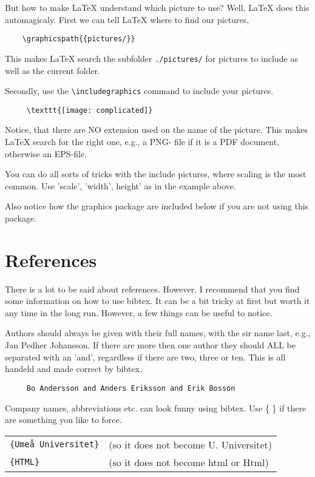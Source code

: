 \documentclass[a4paper,11pt,oneside]{report}
\begin{document}
But how to make {\LaTeX} understand which picture to use? Well,
{\LaTeX} does this automagicaly. First we can tell {\LaTeX} where to
find our pictures,
\begin{verbatim}
    \graphicspath{{pictures/}}
\end{verbatim}
This makes {\LaTeX} search the subfolder \texttt{./pictures/} for
pictures to include as well as the current folder.

Secondly, use the \verb+\includegraphics+ command to include your
pictures.

\begin{verbatim}
     \texttt{[image: complicated]}
\end{verbatim}

Notice, that there are NO extension used on the name of the
picture. This makes {\LaTeX} search for the right one, e.g., a PNG-
file if it is a PDF document, otherwise an EPS-file.

You can do all sorts of tricks with the include pictures, where
scaling is the most common. Use 'scale', 'width', height' as in the
example above.

Also notice how the graphics package are included below if you are
not using this package.

\section{References}

There is a lot to be said about references. However. I recommend
that you find some information on how to use bibtex. It can be a bit
tricky at first but worth it any time in the long run. However, a
few things can be useful to notice.

Authors should always be given with their full names, with the sir
name last, e.g., Jan Pedher Johansson. If there are more then one
author they should ALL be separated with an 'and', regardless if
there are two, three or ten. This is all handeld and made correct
by bibtex.
\begin{verbatim}
     Bo Andersson and Anders Eriksson and Erik Bosson
\end{verbatim}

Company names, abbreviations etc. can look funny using bibtex. Use
\{ \} if there are something you like to force.

\begin{tabular}{ll}
\texttt{\{Umeå Universitet\}} & (so it does not become U. Universitet) \\
\texttt{\{HTML\}} & (so it does not become html or Html)
\end{tabular}
\end{document}
